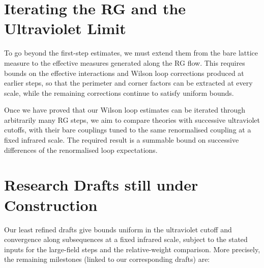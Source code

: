\documentclass[12pt]{article}
\begin{document}
\section{Iterating the RG and the Ultraviolet Limit}



To go beyond the first-step estimates, we must extend them from the bare lattice measure to the effective measures generated along the RG flow. This requires bounds on the effective interactions and Wilson loop corrections produced at earlier steps, so that the perimeter and corner factors can be extracted at every scale, while the remaining corrections continue to satisfy uniform bounds.




Once we have proved that our Wilson loop estimates can be iterated through arbitrarily many RG steps, we aim to compare theories with successive ultraviolet cutoffs, with their bare couplings tuned to the same renormalised coupling at a fixed infrared scale. The required result is a summable bound on successive differences of the renormalised loop expectations. 


\section{Research Drafts still under Construction}

Our least refined drafts give bounds uniform in the ultraviolet cutoff and convergence along subsequences at a fixed infrared scale, subject to the stated inputs for the large-field steps and the relative-weight comparison. More precisely, the remaining milestones (linked to our corresponding drafts) are:
\end{document}

